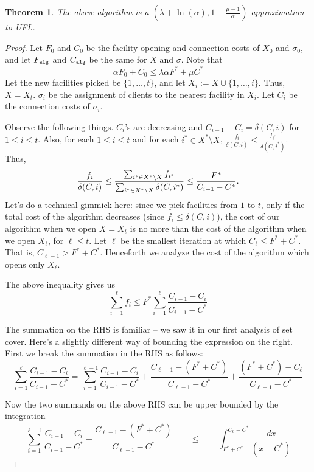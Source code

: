 \documentclass[11pt]{article}
\newtheorem{theorem}{Theorem}
\def\alg{{\tt alg}}
\begin{document}
\begin{theorem}
The above algorithm is a $(\lambda + \ln (\alpha), 1 + \frac{\mu - 1}{\alpha})$ approximation to UFL.
\end{theorem}
\begin{proof}
Let $F_0$ and $C_0$ be the facility opening and connection costs of $X_0$ and $\sigma_0$, 
and let $F_\alg$ and $C_\alg$ be the same for $X$ and $\sigma$.
Note that 
\begin{equation}\label{eq:lambdamu}
\alpha F_0 + C_0 \le \lambda\alpha F^* + \mu C^*
\end{equation}
\noindent
Let the new facilities picked be $\{1,\ldots,t\}$, and let $X_i := X\cup \{1,\ldots ,i\}$. Thus, $X = X_t$.
$\sigma_i$ be the assignment of clients to the nearest facility in $X_i$. Let $C_i$ be the connection costs of $\sigma_i$.

Observe the following things. $C_i$'s are decreasing and $C_{i-1} - C_i = \delta(C,i)$ for $1\le i\le t$.
Also, for each $1\le i\le t$ and for each $i^*\in X^*\setminus X$, $\frac{f_i}{\delta(C,i)} \le \frac{f_{i^*}}{\delta(C,i^*)}$. Thus, 
$$\frac{f_i}{\delta(C,i)} \le \frac{\sum_{{i^*}\in X^*\setminus X} f_{i^*}}{\sum_{{i^*}\in X^*\setminus X}\delta(C,{i^*})} \le \frac{F^*}{C_{i-1} - C^*}.$$
\noindent
Let's do a technical gimmick here: since we pick facilities from $1$ to $t$, only if the total cost of the algorithm decreases (since $f_i \le \delta(C,i)$), the cost of our algorithm when we open $X = X_t$ is no more than the cost of the algorithm when we open $X_\ell$, for $\ell \le t$. Let $\ell$ be the smallest iteration at which $C_\ell \le F^* + C^*$. That is, $C_{\ell - 1} > F^* + C^*$. 
Henceforth we analyze the cost of the algorithm which opens only $X_\ell$.

The above inequality gives us
$$\sum_{i=1}^\ell f_i \le F^* \sum_{i=1}^\ell \frac{C_{i-1} - C_i}{C_{i-1} - C^*}$$

\noindent
The summation on the RHS is familiar -- we saw it in our first analysis of set cover. Here's a slightly different way of bounding the expression on the right. First we break the summation in the RHS  as follows:
$$ \sum_{i=1}^\ell \frac{C_{i-1} - C_i}{C_{i-1} - C^*} = \sum_{i=1}^{\ell-1} \frac{C_{i-1} - C_i}{C_{i-1} - C^*}  + \frac{C_{\ell - 1} - (F^*+C^*)}{C_{\ell-1} - C^*} + \frac{(F^*+C^*) - C_\ell}{C_{\ell-1} - C^*}$$

Now the two summands on the above RHS can be upper bounded by the integration
$$ \sum_{i=1}^{\ell-1} \frac{C_{i-1} - C_i}{C_{i-1} - C^*}  + \frac{C_{\ell - 1} - (F^*+C^*)}{C_{\ell-1} - C^*}  \qquad \le \qquad \int_{F^*+C^*}^{C_0 - C^*} \frac{dx}{\left(x - C^*\right)} $$


\end{proof}
\end{document}
